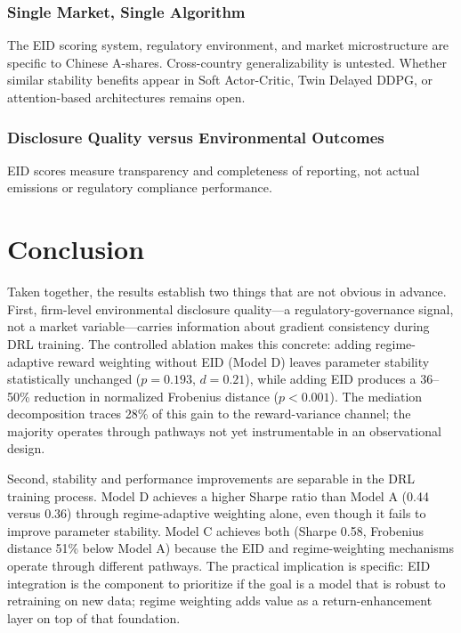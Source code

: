 \documentclass[12pt]{article}
\begin{document}
\subsubsection*{Single Market, Single Algorithm}
The EID scoring system, regulatory environment, and market microstructure
are specific to Chinese A-shares. Cross-country generalizability is
untested. Whether similar stability benefits appear in Soft Actor-Critic,
Twin Delayed DDPG, or attention-based architectures remains open.

\subsubsection*{Disclosure Quality versus Environmental Outcomes}
EID scores measure transparency and completeness of reporting, not
actual emissions or regulatory compliance performance.

\section{Conclusion}
\label{sec:conclusion}

Taken together, the results establish two things that are not obvious
in advance. First, firm-level environmental disclosure quality---a
regulatory-governance signal, not a market variable---carries
information about gradient consistency during DRL training. The
controlled ablation makes this concrete: adding regime-adaptive reward
weighting without EID (Model D) leaves parameter stability
statistically unchanged ($p=0.193$, $d=0.21$), while adding EID
produces a 36--50\% reduction in normalized Frobenius distance
($p<0.001$). The mediation decomposition traces 28\% of this gain to
the reward-variance channel; the majority operates through pathways
not yet instrumentable in an observational design.

Second, stability and performance improvements are separable in the
DRL training process. Model D achieves a higher Sharpe ratio than
Model A (0.44 versus 0.36) through regime-adaptive weighting alone,
even though it fails to improve parameter stability. Model C achieves
both (Sharpe 0.58, Frobenius distance 51\% below Model A) because the
EID and regime-weighting mechanisms operate through different
pathways. The practical implication is specific: EID integration is
the component to prioritize if the goal is a model that is robust to
retraining on new data; regime weighting adds value as a
return-enhancement layer on top of that foundation.
\end{document}
